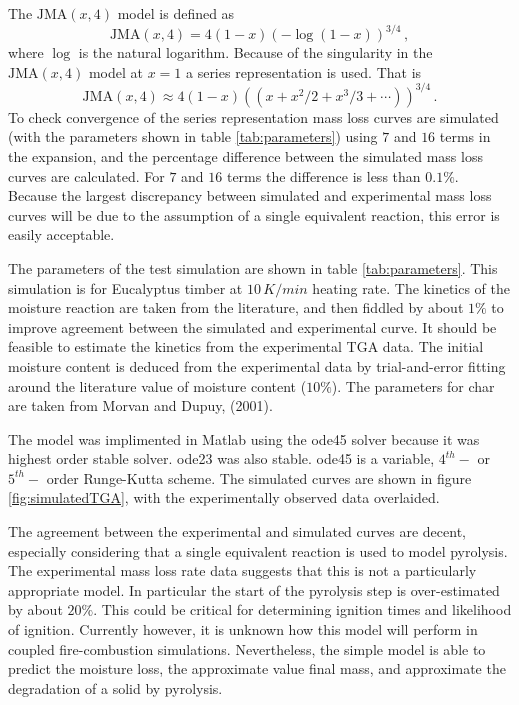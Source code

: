 \documentclass[reqno]{amsart}
\newcommand{\JMA}{\text{JMA}}
\begin{document}
The $\JMA(x,4)$ model is defined as 
\begin{equation}
   \JMA(x,4)=4(1-x)(-\log(1-x))^{3/4}\,,
\end{equation} 
where $\log$ is the natural logarithm.
Because of the singularity in the $\JMA(x,4)$ model at $x=1$ a series representation is used.
That is
\begin{equation}
   \JMA(x,4)\approx 4(1-x)((x+x^2/2+x^3/3+\cdots))^{3/4}\,.
\end{equation} 
To check convergence of the series representation mass loss curves are simulated (with the parameters shown in table \ref{tab:parameters}) using $7$ and $16$ terms in the expansion, and the percentage difference between the simulated mass loss curves are calculated.
For $7$ and $16$ terms the difference is less than $0.1\%$. 
Because the largest discrepancy between simulated and experimental mass loss curves will be due to the assumption of a single equivalent reaction, this error is easily acceptable. 

The parameters of the test simulation are shown in table \ref{tab:parameters}.
This simulation is for Eucalyptus timber at $10\,K/min$ heating rate. 
The kinetics of the moisture reaction are taken from the literature, and then fiddled by about $1\%$ to improve agreement between the simulated and experimental curve. 
It should be feasible to estimate the kinetics from the experimental TGA data. 
The initial moisture content is deduced from the experimental data by trial-and-error fitting around the literature value of moisture content ($10\%$). 
The parameters for char are taken from Morvan and Dupuy, (2001). 


The model was implimented in Matlab using the ode45 solver because it was highest order stable solver. 
ode23 was also stable. 
ode45 is a variable, $4^{th}-$ or $5^{th}-$ order Runge-Kutta scheme.
The simulated curves are shown in figure \ref{fig:simulatedTGA}, with the experimentally observed data overlaided. 

The agreement between the experimental and simulated curves are decent, especially considering that a single equivalent reaction is used to model pyrolysis.
The experimental mass loss rate data suggests that this is not a particularly appropriate model. 
In particular the start of the pyrolysis step is over-estimated by about $20\%$. 
This could be critical for determining ignition times and likelihood of ignition.
Currently however, it is unknown how this model will perform in coupled fire-combustion simulations. 
Nevertheless, the simple model is able to predict the moisture loss, the approximate value final mass, and approximate the degradation of a solid by pyrolysis.
\end{document}

